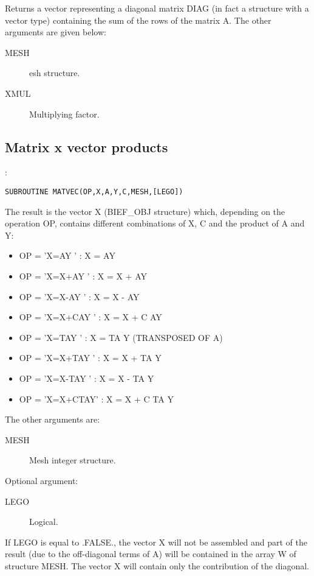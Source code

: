 Returns a vector representing a diagonal matrix DIAG (in fact a
 structure with a vector type) containing the sum of the rows
of the matrix A.  The other arguments are given below:

\begin{description}
  \item [MESH]esh structure.
  \item [XMUL] Multiplying factor.
\end{description}

\subsection{Matrix x vector products}

:
\begin{lstlisting}[language=TelFortran]
SUBROUTINE MATVEC(OP,X,A,Y,C,MESH,[LEGO])
\end{lstlisting}

The result is the vector X (BIEF\_OBJ structure) which, depending on the
operation OP, contains different combinations of X, C and the product of A and
Y:
\begin{itemize}
  \item OP = 'X=AY    '  : X = AY
  \item OP = 'X=X+AY  '  : X = X + AY
  \item OP = 'X=X-AY  '  : X = X - AY
  \item OP = 'X=X+CAY '  : X = X + C AY
  \item OP = 'X=TAY   '  : X = TA Y (TRANSPOSED OF A)
  \item OP = 'X=X+TAY '  : X = X + TA Y
  \item OP = 'X=X-TAY '  : X = X - TA Y
  \item OP = 'X=X+CTAY'  : X = X + C TA Y
\end{itemize}

The other arguments are:
\begin{description}
  \item [MESH] Mesh integer structure.
\end{description}

Optional argument:
\begin{description}
  \item [LEGO] Logical.
\end{description}

If LEGO is equal to .FALSE., the vector X will not be assembled and part of the
result (due to the off-diagonal terms of A) will be contained in the array W of
structure MESH. The vector X will contain only the contribution of the
diagonal.

